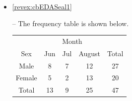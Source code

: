 \documentclass[10pt,openany]{book}\usepackage[]{graphicx}\usepackage[]{color}
\begin{document}
\begin{itemize}
  \item \hypertarget{ans:cbEDASeal1}{\ref{revex:cbEDASeal1}} -- The frequency table is shown below.
    \begin{center}
      \begin{tabular}{c|ccc|c}
        \hline\hline
        \multicolumn{1}{c}{} & \multicolumn{3}{c}{Month} &  \\
        \cline{2-4}
        \multicolumn{1}{c}{Sex} & Jun & Jul & \multicolumn{1}{c}{August} & Total \\
        \hline
        Male & 8 & 7 & 12 & 27 \\
        Female & 5 & 2 & 13 & 20 \\
        \hline
        Total & 13 & 9 & 25 & 47 \\
        \hline\hline
      \end{tabular}
    \end{center}


\end{itemize}
\end{document}
